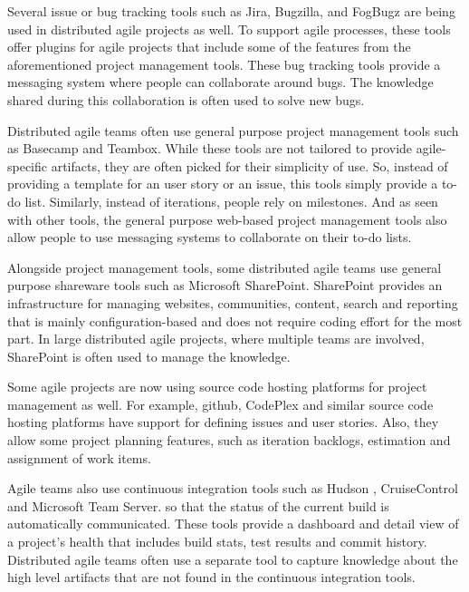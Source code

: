 Several issue or bug tracking tools such as Jira\cite{jira}, Bugzilla\cite{bugzilla}, and FogBugz\cite{fog_bugz} are being used in distributed agile projects as well. To support agile processes, these tools offer plugins for agile projects that include some of the features from the aforementioned project management tools. These bug tracking tools provide a messaging system where people can collaborate around bugs. The knowledge shared during this collaboration is often used to solve new bugs\cite{issue_tracking}.

Distributed agile teams often use general purpose project management tools such as Basecamp\cite{basecamp} and Teambox\cite{team_box}. While these tools are not tailored to provide agile-specific artifacts, they are often picked for their simplicity of use. So, instead of providing a template for an user story or an issue, this tools simply provide a to-do list. Similarly, instead of iterations, people rely on milestones. And as seen with other tools, the general purpose web-based project management tools also allow people to use messaging systems to collaborate on their to-do lists.

Alongside project management tools, some distributed agile teams use general purpose shareware tools such as Microsoft SharePoint\cite{share_point}. SharePoint provides an infrastructure for managing websites, communities, content, search and reporting that is mainly configuration-based and does not require coding effort for the most part. In large distributed agile projects, where multiple teams are involved, SharePoint is often used to manage the knowledge.

Some agile projects are now using source code hosting platforms for project management as well. For example, github\cite{github}, CodePlex\cite{codeplex} and similar source code hosting platforms have support for defining issues and user stories. Also, they allow some project planning features, such as iteration backlogs, estimation and assignment of work items.

Agile teams also use continuous integration tools such as Hudson \cite{Hudson}, CruiseControl\cite{cruise_control} and Microsoft Team Server\cite{team_server}. so that the status of the current build is automatically communicated. These tools provide a dashboard and detail view of a project's health that includes build stats, test results and commit history. Distributed agile teams often use a separate tool to capture knowledge about the high level artifacts that are not found in the continuous integration tools.

